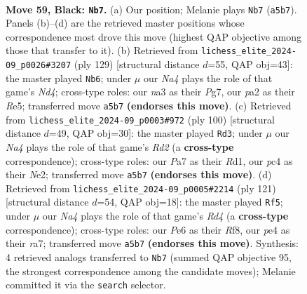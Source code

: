 \documentclass[11pt]{article}
\begin{document}
\clearpage

\begin{figure}[p]\centering
\begin{subfigure}{0.46\textwidth}\centering
\resizebox{\linewidth}{!}{%
\newchessgame
\chessboard[
  setfen={7r/p7/1pr1p1k1/n6p/2PKPB2/N5P1/P4R2/1R6 b - - 1 59},
  showmover=false,
  pgfstyle=straightmove, color=movearrow, markmove={a5-b7}
]}
\caption{}
\end{subfigure}\hfill
\begin{subfigure}{0.46\textwidth}\centering
\resizebox{\linewidth}{!}{%
\newchessgame
\chessboard[
  setfen={8/6pk/5rp1/1P1nr3/2R1p1B1/4P3/5PKP/1R6 b - - 28 65},
  showmover=false,
  pgfstyle=straightmove, color=movearrow, markmove={d5-b6}
]}
\caption{}
\end{subfigure}
\\[4pt]
\begin{subfigure}{0.46\textwidth}\centering
\resizebox{\linewidth}{!}{%
\newchessgame
\chessboard[
  setfen={4r3/5k2/1n6/pprp2p1/6Pp/P4P1P/1P1RNK2/3R4 w - - 0 51},
  showmover=false,
  pgfstyle=straightmove, color=movearrow, markmove={d2-d3}
]}
\caption{}
\end{subfigure}\hfill
\begin{subfigure}{0.46\textwidth}\centering
\resizebox{\linewidth}{!}{%
\newchessgame
\chessboard[
  setfen={5rk1/R3Rpp1/8/3r3p/3P2nP/5NP1/5PK1/8 b - - 5 61},
  showmover=false,
  pgfstyle=straightmove, color=movearrow, markmove={d5-f5}
]}
\caption{}
\end{subfigure}
\caption{\textbf{Move 59, Black: \texttt{Nb7}.} (a) Our position; Melanie plays \texttt{Nb7} (\texttt{a5b7}). Panels (b)--(d) are the retrieved master positions whose correspondence most drove this move (highest QAP objective among those that transfer to it). (b) Retrieved from \texttt{lichess\_elite\_2024-09\_p0026\#3207} (ply 129) [structural distance $d$=55, QAP obj=43]: the master played \texttt{Nb6}; under $\mu$ our \emph{Na4} plays the role of that game's \emph{Nd4}; cross-type roles: our \emph{n}a3 as their \emph{P}g7, our \emph{p}a2 as their \emph{R}e5; transferred move \texttt{a5b7} \textbf{(endorses this move)}. (c) Retrieved from \texttt{lichess\_elite\_2024-09\_p0003\#972} (ply 100) [structural distance $d$=49, QAP obj=30]: the master played \texttt{Rd3}; under $\mu$ our \emph{Na4} plays the role of that game's \emph{Rd2} (a \textbf{cross-type} correspondence); cross-type roles: our \emph{P}a7 as their \emph{R}d1, our \emph{p}c4 as their \emph{N}e2; transferred move \texttt{a5b7} \textbf{(endorses this move)}. (d) Retrieved from \texttt{lichess\_elite\_2024-09\_p0005\#2214} (ply 121) [structural distance $d$=54, QAP obj=18]: the master played \texttt{Rf5}; under $\mu$ our \emph{Na4} plays the role of that game's \emph{Rd4} (a \textbf{cross-type} correspondence); cross-type roles: our \emph{P}e6 as their \emph{R}f8, our \emph{p}e4 as their \emph{r}a7; transferred move \texttt{a5b7} \textbf{(endorses this move)}. Synthesis: 4 retrieved analogs transferred to \texttt{Nb7} (summed QAP objective 95, the strongest correspondence among the candidate moves); Melanie committed it via the \texttt{search} selector.}
\label{fig:thought-m117}
\end{figure}
\end{document}
